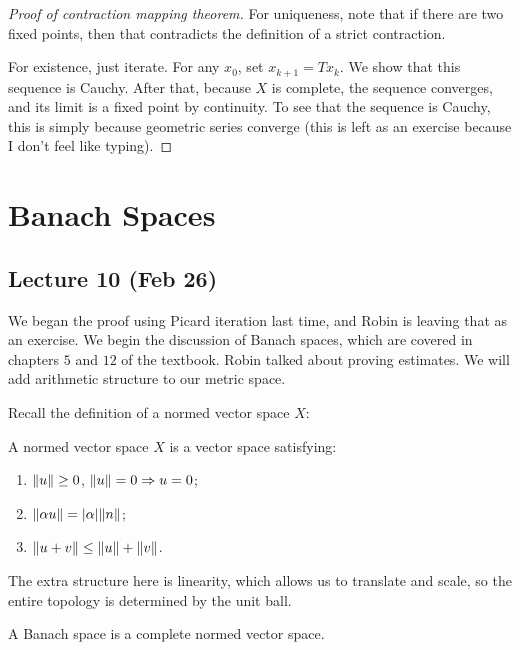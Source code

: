 \documentclass[10pt, twoside]{article}
\begin{document}
    \begin{proof}[Proof of contraction mapping theorem]
        For uniqueness, note that if there are two fixed points, then that contradicts the definition of a strict contraction.

        For existence, just iterate. For any $x_0$, set $x_{k+1} = T x_k$. We show that this sequence is Cauchy. After that, because $X$ is complete, the sequence converges, and its limit is a fixed point by continuity. To see that the sequence is Cauchy, this is simply because geometric series converge (this is left as an exercise because I don't feel like typing).
    \end{proof}

    \section{Banach Spaces}
    
    \subsection{Lecture 10 (Feb 26)}
    We began the proof using Picard iteration last time, and Robin is leaving that as an exercise. We begin the discussion of Banach spaces, which are covered in chapters $5$ and $12$ of the textbook. Robin talked about proving estimates. We will add arithmetic structure to our metric space.

    Recall the definition of a normed vector space $X$:

    \begin{defn}
        A normed vector space $X$ is a vector space satisfying:
        \begin{enumerate}
            \item $\lVert u\rVert \geq 0$, $\lVert u\rVert = 0 \Rightarrow u = 0$;
            \item $\lVert\alpha u\rVert = \lvert\alpha\rvert \lVert n\rVert$;
            \item $\lVert u + v\rVert \leq \lVert u\rVert + \lVert v\rVert$.
        \end{enumerate}
    \end{defn}

    The extra structure here is linearity, which allows us to translate and scale, so the entire topology is determined by the unit ball.

    \begin{defn}
        A Banach space is a complete normed vector space.
    \end{defn}
\end{document}
